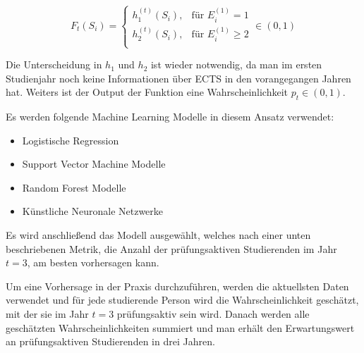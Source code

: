 $$
  F_t(S_i)=
  \left\{
  \begin{array}{lr}
    h_1^{(t)}(S_i), & \text{für }E_i^{(1)} = 1    \\
    h_2^{(t)}(S_i), & \text{für }E_i^{(1)} \geq 2 \\
  \end{array}
  \right.
  \in (0,1)
$$

Die Unterscheidung in $h_1$ und $h_2$ ist wieder notwendig, da man im ersten Studienjahr noch keine Informationen \"uber ECTS in den vorangegangen Jahren hat.
Weiters ist der Output der Funktion eine Wahrscheinlichkeit $p_t \in (0,1)$.

Es werden folgende Machine Learning Modelle in diesem Ansatz verwendet:
\begin{itemize}
  \item Logistische Regression
  \item Support Vector Machine Modelle
  \item Random Forest Modelle
  \item K\"unstliche Neuronale Netzwerke
\end{itemize}

Es wird anschlie{\ss}end das Modell ausgew\"ahlt, welches nach einer unten beschriebenen Metrik, die Anzahl der pr\"ufungsaktiven Studierenden
im Jahr $t = 3$, am besten vorhersagen kann.

Um eine Vorhersage in der Praxis durchzuf\"uhren, werden die aktuellsten Daten verwendet und f\"ur jede studierende Person wird die
Wahrscheinlichkeit gesch\"atzt, mit der sie im Jahr $t=3$ pr\"ufungsaktiv sein wird. Danach werden alle gesch\"atzten Wahrscheinlichkeiten summiert und
man erh\"alt den Erwartungswert an pr\"ufungsaktiven Studierenden in drei Jahren.




